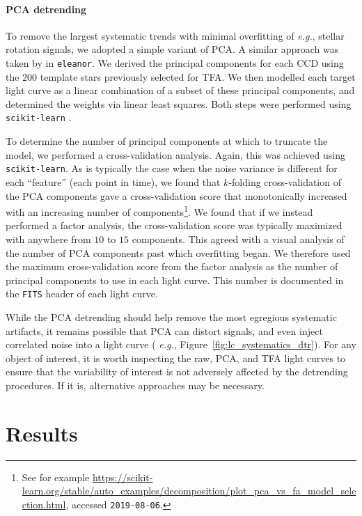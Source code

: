 \documentclass[12pt,twocolumn,tighten]{aastex62}
\begin{document}
\paragraph{PCA detrending}

To remove the largest systematic trends with minimal overfitting of
{\it e.g.}, stellar rotation signals, we adopted a simple variant of
PCA.  A similar approach was taken by \citet{feinstein_eleanor_2019}
in \texttt{eleanor}.  We derived the principal components for each CCD
using the 200 template stars previously selected for TFA.  We then
modelled each target light curve as a linear combination of a subset
of these principal components, and determined the weights via linear
least squares. Both steps were performed using \texttt{scikit-learn}
\citep{sklearn_2011}.

To determine the number of principal components at which to truncate
the model, we performed a cross-validation analysis.  Again, this was
achieved using \texttt{scikit-learn}.  As is typically the case when
the noise variance is different for each ``feature'' (each point in
time), we found that $k$-folding cross-validation of the PCA
components gave a cross-validation score that monotonically increased
with an increasing number of components\footnote{See for example
\url{https://scikit-learn.org/stable/auto_examples/decomposition/plot_pca_vs_fa_model_selection.html}, accessed \texttt{2019-08-06}.}.  We found that if we instead performed a factor
analysis, the cross-validation score was typically maximized with
anywhere from $10$ to $15$ components.  This agreed with a visual
analysis of the number of PCA components past which overfitting began.
We therefore used the maximum cross-validation score from the factor
analysis as the number of principal components to use in each light
curve.  This number is documented in the \texttt{FITS} header of each
light curve.

While the PCA detrending should help remove the most egregious
systematic artifacts, it remains possible that PCA can distort
signals, and even inject correlated noise into a light curve ({\it
e.g.}, Figure~\ref{fig:lc_systematics_dtr}).  For any object of
interest, it is worth inspecting the raw, PCA, and TFA light curves to
ensure that the variability of interest is not adversely affected by
the detrending procedures.  If it is, alternative approaches may be
necessary.


\section{Results}
\label{sec:results}
\end{document}
